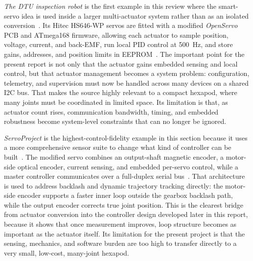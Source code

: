 \emph{The DTU inspection robot} is the first example in this review where the smart-servo idea is used inside a larger multi-actuator system rather than as an isolated conversion~\cite{dtuinspectionrobot}. Its Hitec HS646-WP servos are fitted with a modified \emph{OpenServo} PCB and ATmega168 firmware, allowing each actuator to sample position, voltage, current, and back-EMF, run local PID control at \SI{500}{\hertz}, and store gains, addresses, and position limits in EEPROM~\cite{dtuinspectionrobot}. The important point for the present report is not only that the actuator gains embedded sensing and local control, but that actuator management becomes a system problem: configuration, telemetry, and supervision must now be handled across many devices on a shared I2C bus. That makes the source highly relevant to a compact hexapod, where many joints must be coordinated in limited space. Its limitation is that, as actuator count rises, communication bandwidth, timing, and embedded robustness become system-level constraints that can no longer be ignored.

\emph{ServoProject} is the highest-control-fidelity example in this section because it uses a more comprehensive sensor suite to change what kind of controller can be built~\cite{backstrom2020servoarm}. The modified servo combines an output-shaft magnetic encoder, a motor-side optical encoder, current sensing, and embedded per-servo control, while a master controller communicates over a full-duplex serial bus~\cite{backstrom2020servoarm}. That architecture is used to address backlash and dynamic trajectory tracking directly: the motor-side encoder supports a faster inner loop outside the gearbox backlash path, while the output encoder corrects true joint position. This is the clearest bridge from actuator conversion into the controller design developed later in this report, because it shows that once measurement improves, loop structure becomes as important as the actuator itself. Its limitation for the present project is that the sensing, mechanics, and software burden are too high to transfer directly to a very small, low-cost, many-joint hexapod.

